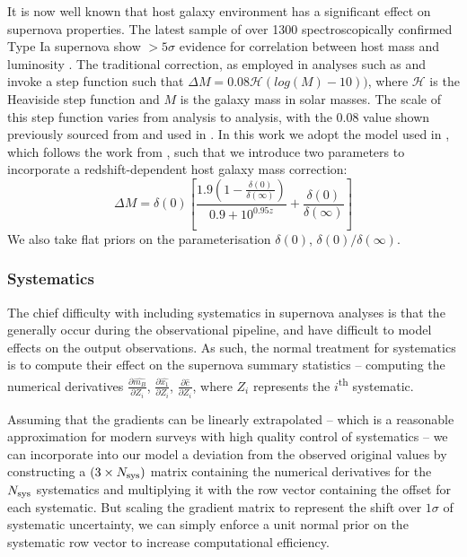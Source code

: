 \documentclass[a4paper,fleqn,usenatbib]{mnras}
\newcommand{\rubin}{\citetalias{Rubin2015}}
\begin{document}
It is now well known that host galaxy environment has a significant effect on supernova properties. The latest sample of over 1300 spectroscopically confirmed Type Ia supernova show $>5\sigma$ evidence for correlation between host mass and luminosity \citep{Uddin2017}. The traditional correction, as employed in analyses such as \citet{Suzuki2012} and \citet{Betoule2014} invoke a step function such that $\Delta M = 0.08 \mathcal{H}(log(M) - 10))$, where $\mathcal{H}$ is the Heaviside step function and $M$ is the galaxy mass in solar masses. The scale of this step function varies from analysis to analysis, with the 0.08 value shown previously sourced from \cite{Sullivan2010} and used in \citet{Betoule2014}. In this work we adopt the model used in {\rubin}, which follows the work from \citet{Rigault2013}, such that we introduce two parameters to incorporate a redshift-dependent host galaxy mass correction:
\begin{equation}
\Delta M = \delta(0) \left[ \frac{1.9\left(1 - \frac{\delta(0)}{\delta(\infty)}\right)  }{0.9 + 10^{0.95z}} + \frac{\delta(0)}{\delta(\infty)}\right]
\end{equation}
We also take flat priors on the parameterisation $\delta(0)$, $\delta(0)/\delta(\infty)$.

\subsubsection{Systematics}
\label{sec:systreat}
The chief difficulty with including systematics in supernova analyses is that the generally occur during the observational pipeline, and have difficult to model effects on the output observations. As such, the normal treatment for systematics is to compute their effect on the supernova summary statistics -- computing the numerical derivatives $\frac{\partial \hat{m_B}}{\partial Z_i}$, $\frac{\partial \hat{x_1}}{\partial Z_i}$, $\frac{\partial \hat{c}}{\partial Z_i}$, where $Z_i$ represents the $i$\textsuperscript{th} systematic.

Assuming that the gradients can be linearly extrapolated -- which is a reasonable approximation for modern surveys with high quality control of systematics -- we can incorporate into our model a deviation from the observed original values by constructing a $(3 \times N_{\rm sys})$ matrix containing the numerical derivatives for the $N_{\rm sys}$ systematics and multiplying it with the row vector containing the offset for each systematic. But scaling the gradient matrix to represent the shift over $1\sigma$ of systematic uncertainty, we can simply enforce a unit normal prior on the systematic row vector to increase computational efficiency.
\end{document}
